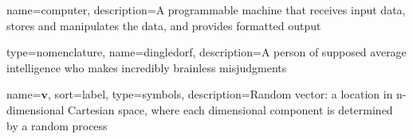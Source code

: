 {
name=computer,
description={A programmable machine that receives input data,
               stores and manipulates the data, and provides
               formatted output}
}

{
type=nomenclature,
name=dingledorf,
description={A person of supposed average intelligence who makes incredibly brainless misjudgments}
}



{
name={$\mathbf{v}$},
sort={label},
type=symbols,
description={Random vector: a location in n-dimensional Cartesian space, where each dimensional component is determined by a random process}
}